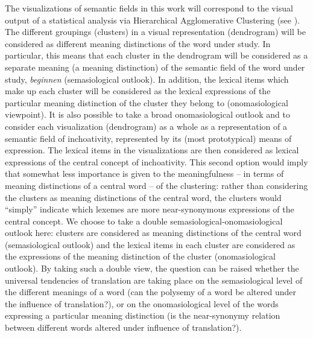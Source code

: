 The visualizations of semantic fields in this work will correspond to the visual output of a statistical analysis via Hierarchical Agglomerative Clustering (see ). The different groupings (clusters) in a visual representation (dendrogram) will be considered as different meaning distinctions of the word under study. In particular, this means that each cluster in the dendrogram will be considered as a separate meaning (a meaning distinction) of the semantic field of the word under study, \textit{beginnen} (semasiological outlook). In addition, the lexical items which make up each cluster will be considered as the lexical expressions of the particular meaning distinction of the cluster they belong to (onomasiological viewpoint). It is also possible to take a broad onomasiological outlook and to consider each visualization (dendrogram) as a whole as a representation of a semantic field of inchoativity, represented by its (most prototypical) means of expression. The lexical items in the visualizations are then considered as lexical expressions of the central concept of inchoativity. This second option would imply that somewhat less importance is given to the meaningfulness – in terms of meaning distinctions of a central word – of the clustering: rather than considering the clusters as meaning distinctions of the central word, the clusters would ``simply'' indicate which lexemes are more near-synonymous expressions of the central concept. We choose to take a double semasiological-onomasiological outlook here: clusters are considered as meaning distinctions of the central word (semasiological outlook) and the lexical items in each cluster are considered as the expressions of the meaning distinction of the cluster (onomasiological outlook). By taking such a double view, the question can be raised whether the universal tendencies of translation are taking place on the semasiological level of the different meanings of a word (can the polysemy of a word be altered under the influence of translation?), or on the onomasiological level of the words expressing a particular meaning distinction (is the near-synonymy relation between different words altered under influence of translation?).

